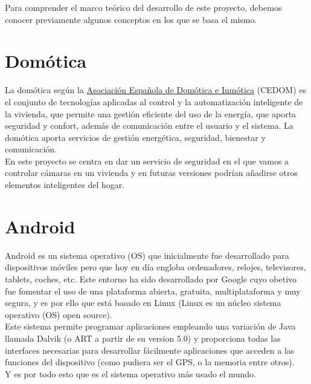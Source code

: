 
Para comprender el marco teórico del desarrollo de este proyecto, debemos conocer previamente algunos conceptos en los que se basa el mismo.

\section{Domótica}

La domótica \cite{domoticaCEDOM} según la \href{http://www.cedom.es/}{Asociación Española de Domótica e Inmótica} (CEDOM) es el conjunto de tecnologías aplicadas al control y la automatización inteligente de la vivienda, que permite una gestión eficiente del uso de la energía, que aporta seguridad y confort, además de comunicación entre el usuario y el sistema. La domótica aporta servicios de gestión energética, seguridad, bienestar y comunicación.\\

En este proyecto se centra en dar un servicio de seguridad en el que vamos a controlar cámaras en un vivienda y en futuras versiones podrían añadirse otros elementos inteligentes del hogar. 



\section{Android}

Android \cite{book:android} es un sistema operativo (OS) que inicialmente fue desarrollado para dispositivos móviles pero que hoy en día engloba ordenadores, relojes, televisores, tablets, coches, etc. Este entorno ha sido desarrollado por Google cuyo obetivo fue fomentar el uso de una plataforma abierta, gratuita, multiplataforma y muy segura, y es por ello que está basado en Linux (Linux es un núcleo sistema operativo (OS) open source).\\
Este sistema permite programar aplicaciones empleando una variación de Java llamada Dalvik (o ART a partir de su version 5.0) y proporciona todas las interfaces necesarias para desarrollar fácilmente aplicaciones que acceden a las funciones del dispositivo (como pudiera ser el GPS, o la memoria entre otros).\\
Y es por todo esto que es el sistema operativo más usado el mundo.




